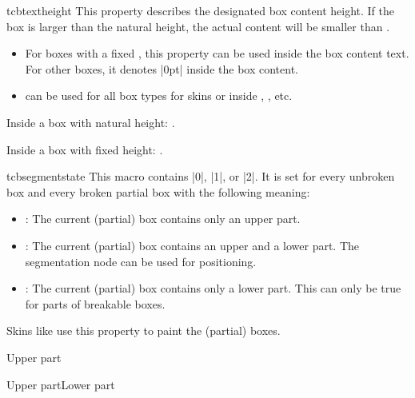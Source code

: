 \pagebreak
\begin{docCommand}[doc new=2016-02-16]{tcbtextheight}{}
  This property describes the designated box content height. If the
  box is larger than the natural height, the actual content will be smaller
  than .
  \begin{itemize}
  \item For boxes with a fixed , this property can
    be used inside the box content text. For other boxes, it denotes |0pt|
    inside the box content.
  \item {} can be used for all box types for skins or
    inside , , etc.
  \end{itemize}

\begin{dispExample}
\begin{tcolorbox}[enhanced,colframe=blue!75!black,
    underlay={\node[left,red] at (frame.east) {Here: \tcbtextheight};}]
  Inside a box with natural height: \tcbtextheight.
\end{tcolorbox}
\begin{tcolorbox}[enhanced,colframe=blue!75!black,height=1cm,
    underlay={\node[left,red] at (frame.east) {Here: \tcbtextheight};}]
  Inside a box with fixed height: \tcbtextheight.
\end{tcolorbox}
\end{dispExample}
\end{docCommand}


\begin{docCommand}[doc new=2017-04-25]{tcbsegmentstate}{}
  This macro contains |0|, |1|, or |2|. It is set for every unbroken box and every broken partial box
  with the following meaning:
  \begin{itemize}
    \item{}: The current (partial) box contains only an upper part.
    \item{}: The current (partial) box contains an upper and a lower part.
      The segmentation node can be used for positioning.
    \item{}: The current (partial) box contains only a lower part.
      This can only be true for parts of breakable boxes.
  \end{itemize}
  Skins like  use this property to paint the (partial) boxes.
\begin{dispExample}
\begin{tcbraster}[raster equal height,enhanced,
    watermark text=\tcbsegmentstate]
  \begin{tcolorbox}Upper part\end{tcolorbox}
  \begin{tcolorbox}Upper part\tcblower Lower part\end{tcolorbox}
\end{tcbraster}
\end{dispExample}
\end{docCommand}
